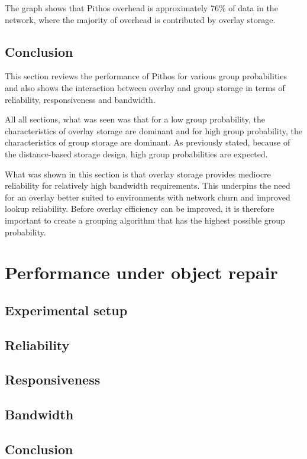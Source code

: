 The graph shows that Pithos overhead is approximately 76\% of data in the network, where the majority of overhead is contributed by overlay storage.

\subsection{Conclusion}

This section reviews the performance of Pithos for various group probabilities and also shows the interaction between overlay and group storage in terms of reliability, responsiveness and bandwidth.

All all sections, what was seen was that for a low group probability, the characteristics of overlay storage are dominant and for high group probability, the characteristics of group storage are dominant. As previously stated, because of the distance-based storage design, high group probabilities are expected.

What was shown in this section is that overlay storage provides mediocre reliability for relatively high bandwidth requirements. This underpins the need for an overlay better suited to environments with network churn and improved lookup reliability. Before overlay efficiency can be improved, it is therefore important to create a grouping algorithm that has the highest possible group probability.

\section{Performance under object repair}
\label{repair_results}


\subsection{Experimental setup}
\subsection{Reliability}
\subsection{Responsiveness}
\subsection{Bandwidth}
\subsection{Conclusion}

